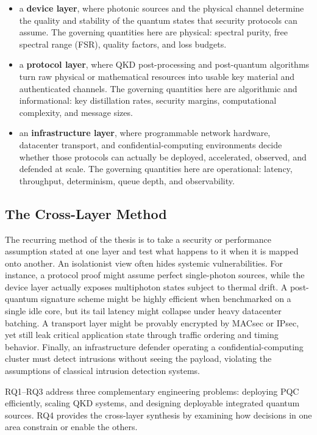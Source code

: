 \begin{itemize}
  \item a \textbf{device layer}, where photonic sources and the physical channel
        determine the quality and stability of the quantum states that security
        protocols can assume. The governing quantities here are physical: spectral
        purity, free spectral range (FSR), quality factors, and loss budgets.
  \item a \textbf{protocol layer}, where QKD post-processing and post-quantum
        algorithms turn raw physical or mathematical resources into usable key
        material and authenticated channels. The governing quantities here are
        algorithmic and informational: key distillation rates, security margins,
        computational complexity, and message sizes.
  \item an \textbf{infrastructure layer}, where programmable network hardware,
        datacenter transport, and confidential-computing environments decide
        whether those protocols can actually be deployed, accelerated, observed,
        and defended at scale. The governing quantities here are operational:
        latency, throughput, determinism, queue depth, and observability.
\end{itemize}

\subsection{The Cross-Layer Method}

The recurring method of the thesis is to take a security or performance
assumption stated at one layer and test what happens to it when it is mapped
onto another. An isolationist view often hides systemic vulnerabilities. For
instance, a protocol proof might assume perfect single-photon sources, while the
device layer actually exposes multiphoton states subject to thermal drift. A
post-quantum signature scheme might be highly efficient when benchmarked on a
single idle core, but its tail latency might collapse under heavy datacenter
batching. A transport layer might be provably encrypted by MACsec or IPsec, yet
still leak critical application state through traffic ordering and timing behavior.
Finally, an infrastructure defender operating a confidential-computing cluster must
detect intrusions without seeing the payload, violating the assumptions of classical
intrusion detection systems.

RQ1--RQ3 address three complementary engineering problems: deploying PQC
efficiently, scaling QKD systems, and designing deployable integrated quantum
sources. RQ4 provides the cross-layer synthesis by examining how decisions in
one area constrain or enable the others.

